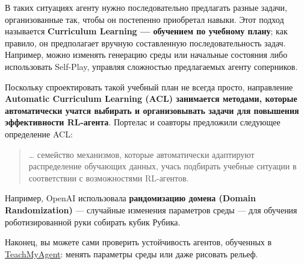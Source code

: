 \documentclass[11pt,a4paper]{article}
\begin{document}


В таких ситуациях агенту нужно последовательно предлагать разные задачи, организованные так, чтобы он постепенно приобретал навыки. Этот подход называется \textbf{Curriculum Learning --- обучением по учебному плану}; как правило, он предполагает вручную составленную последовательность задач. Например, можно изменять генерацию среды или начальные состояния либо использовать Self-Play, управляя сложностью предлагаемых агенту соперников.

Поскольку спроектировать такой учебный план не всегда просто, направление \textbf{Automatic Curriculum Learning (ACL) занимается методами, которые автоматически учатся выбирать и организовывать задачи для повышения эффективности RL-агента}. Портелас и соавторы предложили следующее определение ACL:

\begin{quote}
\ldots{} семейство механизмов, которые автоматически адаптируют распределение обучающих данных, учась подбирать учебные ситуации в соответствии с возможностями RL-агентов.
\end{quote}

Например, OpenAI использовала \textbf{рандомизацию домена (Domain Randomization)} --- случайные изменения параметров среды --- для обучения роботизированной руки собирать кубик Рубика.


Наконец, вы можете сами проверить устойчивость агентов, обученных в \href{https://huggingface.co/spaces/flowers-team/Interactive_DeepRL_Demo}{TeachMyAgent}: менять параметры среды или даже рисовать рельеф.
\end{document}

